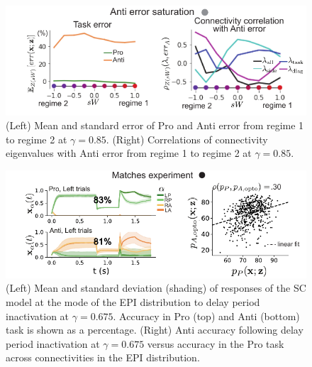 \documentclass[11pt]{article}
\begin{document}
\begin{figure}
\begin{center}
\includegraphics[scale=1.2]{figures/figSC5/figSC5.pdf}
\end{center}
\caption{
(Left) Mean and standard error of Pro and Anti error from regime 1 to regime 2 at $\gamma = 0.85$.
(Right) Correlations of connectivity eigenvalues with Anti error from regime 1 to regime 2 at $\gamma = 0.85$.
}
\label{fig:SC5}
\end{figure}

\begin{figure}
\begin{center}
\includegraphics[scale=1.2]{figures/figSC6/figSC6.pdf}
\end{center}
\caption{
(Left) Mean and standard deviation (shading) of responses of the SC model at the mode of the EPI distribution to delay period inactivation at $\gamma = 0.675$. Accuracy in Pro (top) and Anti (bottom) task is shown as a percentage. (Right) Anti accuracy following delay period inactivation at $\gamma = 0.675$ versus accuracy in the Pro task across connectivities in the EPI distribution.
}
\label{fig:SC6}
\end{figure}
\end{document}
